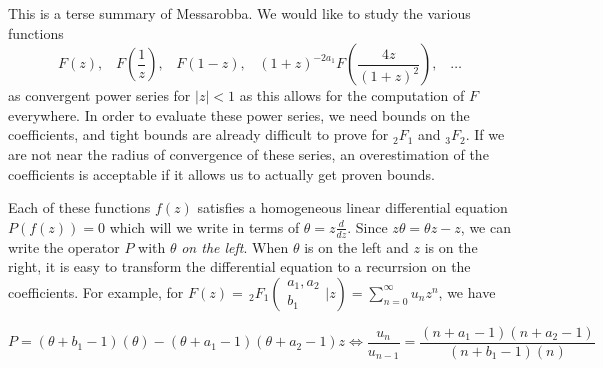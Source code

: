 \documentclass[10pt]{article}
\begin{document}
This is a terse summary of Messarobba. We would like to study the various functions
\begin{equation*}
F\left(z\right)\text{,} \quad F\left(\frac{1}{z}\right)\text{,} \quad F\left(1-z\right)\text{,} \quad  (1+z)^{-2a_1} F\left(\frac{4z}{(1+z)^2}\right)\text{,} \quad \dots
\end{equation*}
as convergent power series for $|z|<1$ as this allows for the computation of $F$ everywhere. In order to evaluate these power series, we need bounds on the coefficients, and tight bounds are already difficult to prove for ${}_2 F_1$ and ${}_3 F_2$. If we are not near the radius of convergence of these series, an overestimation of the coefficients is acceptable if it allows us to actually get proven bounds.

Each of these functions $f(z)$ satisfies a homogeneous linear differential equation $P(f(z))=0$ which will we write in terms of $\theta = z \frac{d}{dz}$. Since $z\theta = \theta z - z$, we can write the operator $P$ with $\theta$ \emph{on the left}. When $\theta$ is on the left and $z$ is on the right, it is easy to transform the differential equation to a recurrsion on the coefficients. For example, for $F(z) = \, _2F_1\left(\begin{array}{c} a_1,a_2 \\ b_1 \end{array} \Big| z\right) = \sum_{n=0}^{\infty}{u_n} z^n$, we have

\begin{equation*}
P = (\theta+b_1-1)(\theta) - (\theta+a_1-1)(\theta+a_2-1)z \Leftrightarrow \frac{u_n}{u_{n-1}} = \frac{(n+a_1-1)(n+a_2-1)}{(n+b_1-1)(n)}
\end{equation*}
\end{document}
